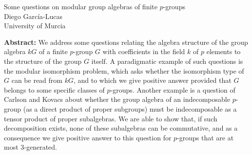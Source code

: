 \documentclass[12pt,a4paper]{article}
\begin{document}
\thispagestyle{empty} 
\begin{center}
{\large  Some questions on modular group algebras of finite $p$-groups}\\
\vspace*{.5cm}
Diego Garc\'ia-Lucas\\
University of Murcia\\
\end{center}
\vspace*{.8cm}

{\bf Abstract:}  We address some questions relating the algebra structure of the group algebra $kG$ of a finite $p$-group $G$ with coefficients in the field $k$ of $p$ elements to the structure of the group $G$ itself. A paradigmatic example of such questions is the modular isomorphism problem, which asks whether the isomorphism type of $G$ can be read from $kG$,  and to which we give positive answer provided that $G$ belongs to some specific classes of $p$-groups. Another example is a question of Carlson and Kovacs about whether the group algebra of an indecomposable $p$-group (as a direct product of proper subgroups) must be indecomposable as a tensor product of proper subalgebras. We are able to show that, if such decomposition exists, none of these subalgebras can be commutative, and as a consequence we give positive answer to this question for $p$-groups that are at most 3-generated.
\end{document}
